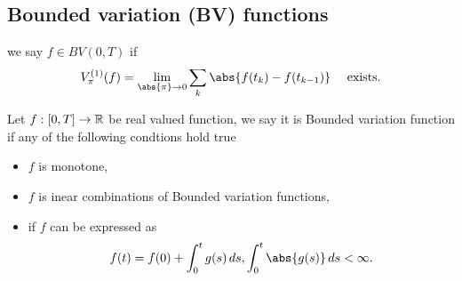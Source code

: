 \subsection{Bounded variation (BV) functions}
\begin{dfn}
we say $f \in BV(0,T)$ if 
\begin{equation*}
    V_\pi^{(1)}(f) = \lim_{\abs{\pi}\rightarrow 0} \bigs{k} \abs{f(t_k) - f(t_{k-1})} \quad \text{ exists.}
\end{equation*}
\end{dfn}

\begin{thm}
Let $f: [0,T] \to \mathbb{R}$ be real valued function, we say it is Bounded variation function if any of the following condtions hold true
\begin{itemize}
    \item $f$ is monotone,
    \item $f$ is inear combinations of Bounded variation functions,
    \item if $f$ can be expressed as 
    \begin{equation*}
        f(t) = f(0) + \int_0^t g(s) \diff s, \int_0^t \abs{g(s)} \diff s <\infty.
    \end{equation*}
\end{itemize}
\end{thm}

